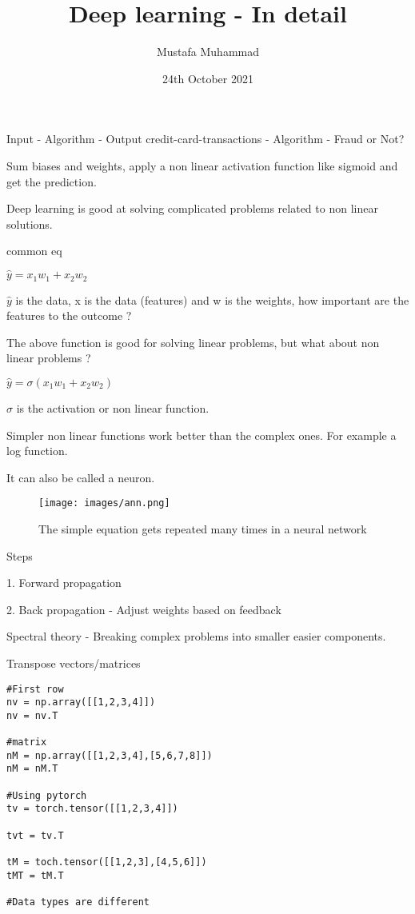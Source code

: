 \documentclass[30pt, a4]{article}
\title{Deep learning - In detail}
\author{Mustafa Muhammad}
\date{24th October 2021}
\begin{document}
\maketitle

Input - Algorithm - Output
credit-card-transactions - Algorithm - Fraud or Not?

Sum biases and weights, apply a non linear activation function like sigmoid
and get the prediction.

Deep learning is good at solving complicated problems related to non linear 
solutions.

common eq

{
\Large $\hat y = x_1w_1 + x_2w_2$
}

$\hat y$ is the data, x is the data (features) and w is the weights, how important
are the features to the outcome ?

The above function is good for solving linear problems, but what about non linear
problems ?

{
\Large $\hat y = \sigma(x_1w_1 + x_2w_2)$
}

$\sigma$ is the activation or non linear function.

Simpler non linear functions work better than the complex ones. For example a 
log function.

It can also be called a neuron.

\begin{figure*}[htp]
    \centering
    \texttt{[image: images/ann.png]}
    \caption{The simple equation gets repeated many times in a neural network}
\end{figure*}
\newpage
Steps

1. Forward propagation 

2. Back propagation - Adjust weights based on feedback

Spectral theory - Breaking complex problems into smaller easier components.

Transpose vectors/matrices
\begin{lstlisting}
#First row
nv = np.array([[1,2,3,4]])
nv = nv.T

#matrix
nM = np.array([[1,2,3,4],[5,6,7,8]])
nM = nM.T

#Using pytorch
tv = torch.tensor([[1,2,3,4]])

tvt = tv.T

tM = toch.tensor([[1,2,3],[4,5,6]])
tMT = tM.T

#Data types are different
\end{lstlisting}
\end{document}
